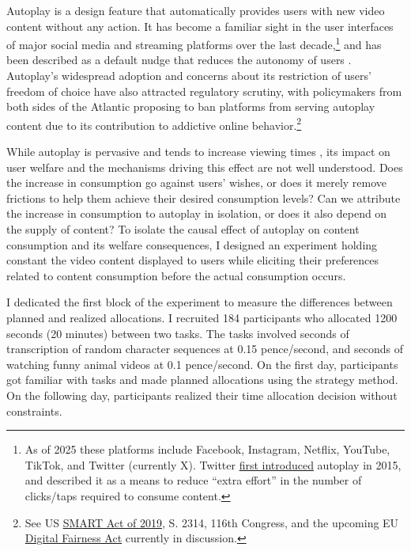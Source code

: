 \documentclass[11pt,a4paper,oneside]{article}
\begin{document}
Autoplay is a design feature that automatically provides users with new video content without any action. It has become a familiar sight in the user interfaces of major social media and streaming platforms over the last decade,\footnote{As of 2025 these platforms include Facebook, Instagram, Netflix, YouTube, TikTok, and Twitter (currently X). Twitter \href{https://blog.x.com/official/en_us/a/2015/introducing-a-more-seamless-video-experience-with-autoplay.html}{first introduced} autoplay in 2015, and described it as a means to reduce ``extra effort'' in the number of clicks/taps required to consume content.} and has been described as a default nudge that reduces the autonomy of users \citep{lukoff2021design,schaffner2023pahia}. Autoplay's widespread adoption and concerns about its restriction of users' freedom of choice have also attracted regulatory scrutiny, with policymakers from both sides of the Atlantic proposing to ban platforms from serving autoplay content due to its contribution to addictive online behavior.\footnote{See US \href{https://www.congress.gov/bill/116th-congress/senate-bill/2314/text}{SMART Act of 2019}, S. 2314, 116th Congress, and the upcoming EU \href{https://digitalfairnessact.com/what-is-the-digital-fairness-act}{Digital Fairness Act} currently in discussion.}

While autoplay is pervasive and tends to increase viewing times \citep{chen2025,hiniker2018coco,schaffner2025pahi}, its impact on user welfare and the mechanisms driving this effect are not well understood. Does the increase in consumption go against users' wishes, or does it merely remove frictions to help them achieve their desired consumption levels? Can we attribute the increase in consumption to autoplay in isolation, or does it also depend on the supply of content? To isolate the causal effect of autoplay on content consumption and its welfare consequences, I designed an experiment holding constant the video content displayed to users while eliciting their preferences related to content consumption before the actual consumption occurs.

I dedicated the first block of the experiment to measure the differences between planned and realized allocations. I recruited 184 participants who allocated 1200 seconds (20 minutes) between two tasks. The tasks involved seconds of transcription of random character sequences at 0.15 pence/second, and seconds of watching funny animal videos at 0.1 pence/second. On the first day, participants got familiar with tasks and made planned allocations using the strategy method. On the following day, participants realized their time allocation decision without constraints.
\end{document}
